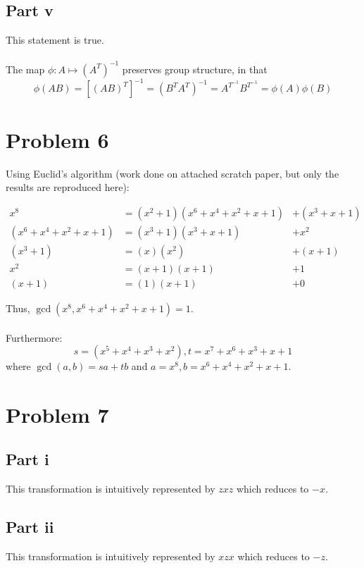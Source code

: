 \documentclass[letterpaper]{article}
\begin{document}
\subsection{Part v}
\label{subs:Partv}

This statement is true.
\\ \\
The map $ \phi : A \mapsto {(A^T)}^{-1} $ preserves group structure, in that
$$ \phi(AB) = \left[{(AB)}^T\right]^{-1} = {(B^T A^T)}^{-1} = A^{T^{-1}} B^{T^{-1}} = \phi(A) \phi(B) $$

\section{Problem 6}
\label{Problem6}

Using Euclid's algorithm (work done on attached scratch paper, but only the results are reproduced here):

\begin{align}
    x^8 & = (x^2 + 1) (x^6 + x^4 + x^2 + x + 1) & + (x^3 + x + 1) \\
    (x^6 + x^4 + x^2 + x + 1) & = (x^3 + 1) (x^3 + x + 1) & + x^2 \\
    (x^3 + 1) & = (x) (x^2) & + (x + 1) \\
    x^2 & = (x + 1) (x + 1) & + 1 \\
    (x + 1) & = (1) (x + 1) & + 0
\end{align}

Thus, $ \gcd(x^8, x^6 + x^4 + x^2 + x + 1) = 1 $.
\\ \\
Furthermore:
$$ s = (x^5 + x^4 + x^3 + x^2), t = x^7 + x^6 + x^3 + x + 1 $$
where $ \gcd(a, b) = sa + tb $ and $ a = x^8, b = x^6 + x^4 + x^2 + x + 1 $.

\section{Problem 7}
\label{Problem7}

\subsection{Part i}
\label{Parti}
This transformation is intuitively represented by $ zxz $ which reduces to $ -x $.

\subsection{Part ii}
\label{Partii}
This transformation is intuitively represented by $ xzx $ which reduces to $ -z $.
\end{document}
